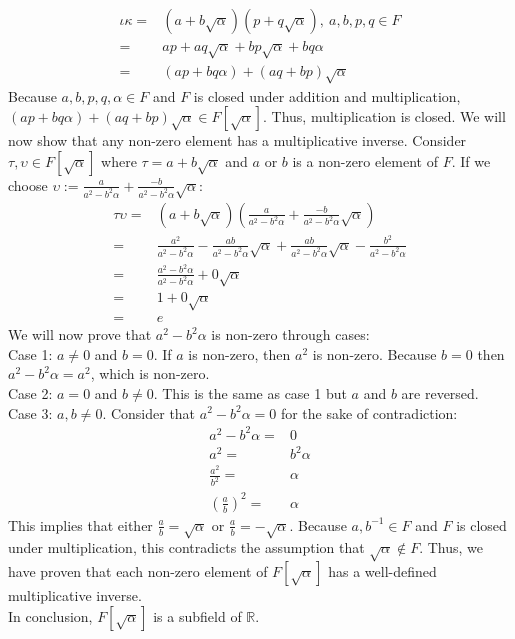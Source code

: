 \documentclass[11pt]{article}
\begin{document}
\begin{flushleft}
\begin{align*}
\iota \kappa = & (a + b \sqrt{\alpha})(p + q \sqrt{\alpha}), \ a,b,p,q \in F \\
= & ap + aq\sqrt{\alpha} + bp\sqrt{\alpha} + bq \alpha \\
= & (ap + bq \alpha) + (aq + bp) \sqrt{\alpha}
\end{align*}
Because $a,b,p,q,\alpha \in F$ and $F$ is closed under addition and multiplication, $(ap + bq \alpha) + (aq + bp) \sqrt{\alpha} \in F[\sqrt{\alpha}]$. Thus, multiplication is closed. We will now show that any non-zero element has a multiplicative inverse. Consider $\tau , \upsilon \in F[\sqrt{\alpha}]$ where $\tau = a + b \sqrt{\alpha}$ and $a$ or $b$ is a non-zero element of $F$. If we choose $\upsilon := \frac{a}{a^2 -b^2 \alpha} + \frac{-b}{a^2 - b^2 \alpha} \sqrt{\alpha}$:
\begin{align*}
\tau \upsilon = & (a + b \sqrt{\alpha})(\frac{a}{a^2 -b^2 \alpha} + \frac{-b}{a^2 - b^2 \alpha} \sqrt{\alpha}) \\
= & \frac{a^2}{a^2 -b^2 \alpha} - \frac{ab}{a^2 -b^2 \alpha}\sqrt{\alpha} + \frac{ab}{a^2 -b^2 \alpha}\sqrt{\alpha} - \frac{b^2}{a^2 -b^2 \alpha} \\
= & \frac{a^2 -b^2 \alpha}{a^2 -b^2 \alpha} + 0 \sqrt{\alpha} \\
= & 1 + 0 \sqrt{\alpha} \\
= & e
\end{align*}
We will now prove that $a^2 -b^2 \alpha$ is non-zero through cases: \\
Case 1: $a \neq 0$ and $b = 0$. If $a$ is non-zero, then $a^2$ is non-zero. Because $b = 0$ then $a^2 -b^2 \alpha = a^2$, which is non-zero. \\
Case 2: $a = 0$ and $b \neq 0$. This is the same as case 1 but $a$ and $b$ are reversed. \\
Case 3: $a,b \neq 0$. Consider that $a^2 -b^2 \alpha = 0$ for the sake of contradiction:
\begin{align*}
a^2 -b^2 \alpha = & 0 \\
a^2 = & b^2 \alpha \\
\frac{a^2}{b^2} = & \alpha \\
(\frac{a}{b})^2 = & \alpha
\end{align*}
This implies that either $\frac{a}{b} = \sqrt{\alpha}$ or $\frac{a}{b} = -\sqrt{\alpha}$. Because $a,b^{-1} \in F$ and $F$ is closed under multiplication, this contradicts the assumption that $\sqrt{\alpha} \notin F$. Thus, we have proven that each non-zero element of $F[\sqrt{\alpha}]$ has a well-defined multiplicative inverse. \\
\bigskip
In conclusion, $F[\sqrt{\alpha}]$ is a subfield of $\mathbb{R}$.


\end{flushleft}
\end{document}
